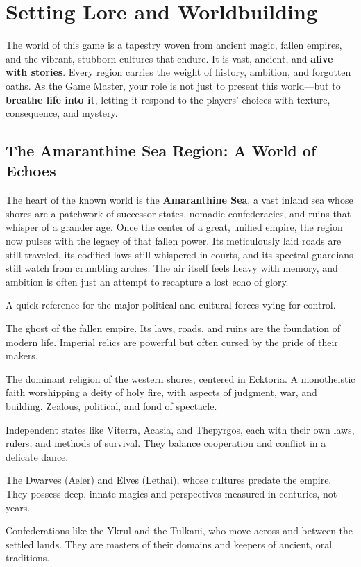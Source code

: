 \chapter{Setting Lore and Worldbuilding}

The world of this game is a tapestry woven from ancient magic, fallen empires, and the vibrant, stubborn cultures that endure. It is vast, ancient, and \textbf{alive with stories}. Every region carries the weight of history, ambition, and forgotten oaths. As the Game Master, your role is not just to present this world---but to \textbf{breathe life into it}, letting it respond to the players' choices with texture, consequence, and mystery.

\section*{The Amaranthine Sea Region: A World of Echoes}

The heart of the known world is the \textbf{Amaranthine Sea}, a vast inland sea whose shores are a patchwork of successor states, nomadic confederacies, and ruins that whisper of a grander age. Once the center of a great, unified empire, the region now pulses with the legacy of that fallen power. Its meticulously laid roads are still traveled, its codified laws still whispered in courts, and its spectral guardians still watch from crumbling arches. The air itself feels heavy with memory, and ambition is often just an attempt to recapture a lost echo of glory.

\begin{tcolorbox}[title=The Amaranthine Sea at a Glance, colback=blue!5!white, colframe=blue!75!black, fonttitle=\bfseries, breakable]
A quick reference for the major political and cultural forces vying for control.
\begin{description}[wide]
    \item[**The Imperial Legacy**] The ghost of the fallen empire. Its laws, roads, and ruins are the foundation of modern life. Imperial relics are powerful but often cursed by the pride of their makers.
    \item[**The Everflame Faith**] The dominant religion of the western shores, centered in Ecktoria. A monotheistic faith worshipping a deity of holy fire, with aspects of judgment, war, and building. Zealous, political, and fond of spectacle.
    \item[**The Free Cities \& Kingdoms**] Independent states like Viterra, Acasia, and Thepyrgos, each with their own laws, rulers, and methods of survival. They balance cooperation and conflict in a delicate dance.
    \item[**The Old Peoples**] The Dwarves (Aeler) and Elves (Lethai), whose cultures predate the empire. They possess deep, innate magics and perspectives measured in centuries, not years.
    \item[**The Nomadic Powers**] Confederations like the Ykrul and the Tulkani, who move across and between the settled lands. They are masters of their domains and keepers of ancient, oral traditions.
\end{description}
\end{tcolorbox}

